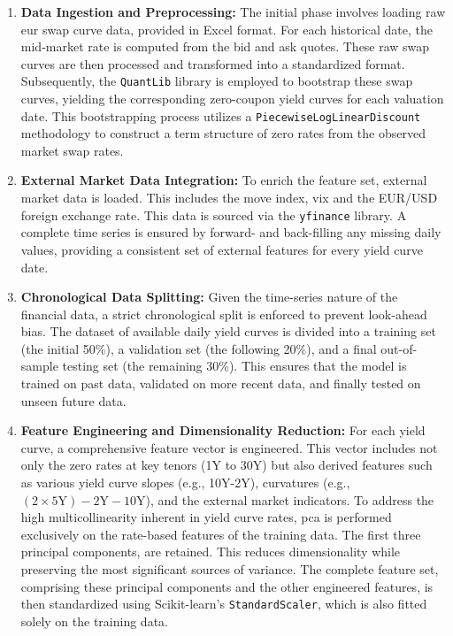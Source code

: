 \begin{enumerate}
	\item \textbf{Data Ingestion and Preprocessing:}
	      The initial phase involves loading raw \ac{eur} swap curve data, provided in Excel format. For each historical date, the mid-market rate is computed from the bid and ask quotes. These raw swap curves are then processed and transformed into a standardized format. Subsequently, the \texttt{QuantLib} library is employed to bootstrap these swap curves, yielding the corresponding zero-coupon yield curves for each valuation date. This bootstrapping process utilizes a \texttt{PiecewiseLogLinearDiscount} methodology to construct a term structure of zero rates from the observed market swap rates.

	\item \textbf{External Market Data Integration:}
	      To enrich the feature set, external market data is loaded. This includes the \ac{move} index, \ac{vix} and the EUR/USD foreign exchange rate. This data is sourced via the \texttt{yfinance} library. A complete time series is ensured by forward- and back-filling any missing daily values, providing a consistent set of external features for every yield curve date.

	\item \textbf{Chronological Data Splitting:}
	      Given the time-series nature of the financial data, a strict chronological split is enforced to prevent look-ahead bias. The dataset of available daily yield curves is divided into a training set (the initial 50\%), a validation set (the following 20\%), and a final out-of-sample testing set (the remaining 30\%). This ensures that the model is trained on past data, validated on more recent data, and finally tested on unseen future data.

	\item \textbf{Feature Engineering and Dimensionality Reduction:}
	      For each yield curve, a comprehensive feature vector is engineered. This vector includes not only the zero rates at key tenors (1Y to 30Y) but also derived features such as various yield curve slopes (e.g., 10Y-2Y), curvatures (e.g., $(2 \times 5\text{Y}) - 2\text{Y} - 10\text{Y}$), and the external market indicators. To address the high multicollinearity inherent in yield curve rates, \ac{pca} is performed exclusively on the rate-based features of the training data. The first three principal components, are retained. This reduces dimensionality while preserving the most significant sources of variance. The complete feature set, comprising these principal components and the other engineered features, is then standardized using Scikit-learn's \texttt{StandardScaler}, which is also fitted solely on the training data.


\end{enumerate}
